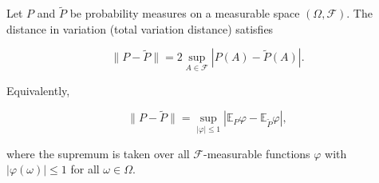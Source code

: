 Let $P$ and $\tilde{P}$ be probability measures on a measurable space $(\Omega, \mathcal{F})$. The distance in variation (total variation distance) satisfies

$$\|P - \tilde{P}\| = 2 \sup_{A \in \mathcal{F}} |P(A) - \tilde{P}(A)|.$$

Equivalently,

$$\|P - \tilde{P}\| = \sup_{|\varphi| \leq 1} |\mathbb{E}_P \varphi - \mathbb{E}_{\tilde{P}} \varphi|,$$

where the supremum is taken over all $\mathcal{F}$-measurable functions $\varphi$ with $|\varphi(\omega)| \leq 1$ for all $\omega \in \Omega$.
